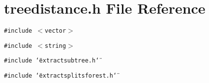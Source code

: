 \section{treedistance.h File Reference}
\label{treedistance_8h}
{\tt \#include $<$vector$>$}\par
{\tt \#include $<$string$>$}\par
{\tt \#include \char`\"{}extractsubtree.h\char`\"{}}\par
{\tt \#include \char`\"{}extractsplitsforest.h\char`\"{}}\par
